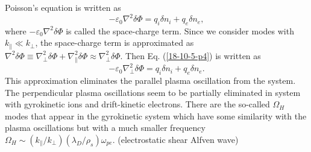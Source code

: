 \documentclass{article}
\begin{document}
Poisson's equation is written as
\begin{equation}
  \label{18-10-5-p4} - \varepsilon_0 \nabla^2 \delta \Phi = q_i \delta n_i +
  q_e \delta n_e,
\end{equation}
where $- \varepsilon_0 \nabla^2 \delta \Phi$ is called the space-charge term.
Since we consider modes with $k_{\parallel} \ll k_{\perp}$, the space-charge
term is approximated as $\nabla^2 \delta \Phi \equiv \nabla^2_{\perp} \delta
\Phi + \nabla^2_{\parallel} \delta \Phi \approx \nabla^2_{\perp} \delta \Phi$.
Then Eq. (\ref{18-10-5-p4}) is written as
\begin{equation}
  \label{19-1-12-e2} - \varepsilon_0 \nabla^2_{\perp} \delta \Phi = q_i \delta
  n_i + q_e \delta n_e .
\end{equation}
This approximation eliminates the parallel plasma oscillation from the system.
The perpendicular plasma oscillations seem to be partially eliminated in
system with gyrokinetic ions and drift-kinetic electrons. There are the
so-called $\Omega_H$ modes that appear in the gyrokinetic system which have
some similarity with the plasma oscillations but with a much smaller frequency
$\Omega_H \sim (k_{\parallel} / k_{\perp}) (\lambda_D / \rho_s) \omega_{p e}$.
(electrostatic shear Alfven wave)
\end{document}
